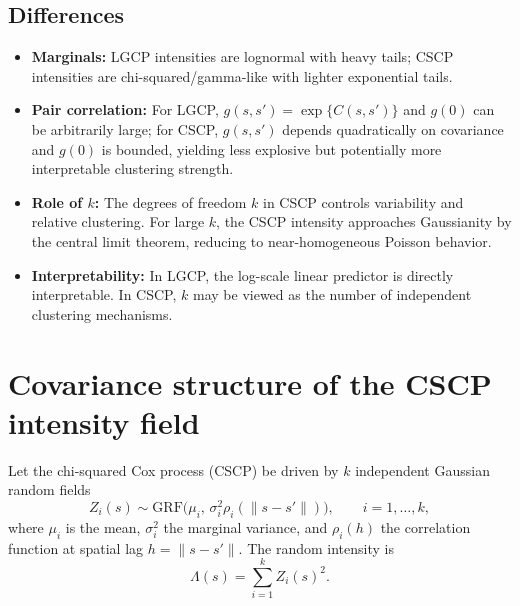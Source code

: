 \documentclass[11pt]{article}
\begin{document}
	\subsection*{Differences}
	\begin{itemize}
		\item \textbf{Marginals:} LGCP intensities are lognormal with heavy tails; CSCP intensities are chi-squared/gamma-like with lighter exponential tails.
		\item \textbf{Pair correlation:} For LGCP, $g(s,s') = \exp\{ C(s,s') \}$ and $g(0)$ can be arbitrarily large; for CSCP, $g(s,s')$ depends quadratically on covariance and $g(0)$ is bounded, yielding less explosive but potentially more interpretable clustering strength.
		\item \textbf{Role of $k$:} The degrees of freedom $k$ in CSCP controls variability and relative clustering. For large $k$, the CSCP intensity approaches Gaussianity by the central limit theorem, reducing to near-homogeneous Poisson behavior.
		\item \textbf{Interpretability:} In LGCP, the log-scale linear predictor is directly interpretable. In CSCP, $k$ may be viewed as the number of independent clustering mechanisms.
	\end{itemize}
	
	
%	




\section{Covariance structure of the CSCP intensity field}

Let the chi-squared Cox process (CSCP) be driven by $k$ independent Gaussian random fields 
\[
Z_i(s) \sim \mathrm{GRF}\!\big(\mu_i,\, \sigma_i^2 \rho_i(\|s-s'\|)\big), 
\qquad i=1,\dots,k,
\]
where $\mu_i$ is the mean, $\sigma_i^2$ the marginal variance, and 
$\rho_i(h)$ the correlation function at spatial lag $h=\|s-s'\|$. 
The random intensity is
\[
\Lambda(s) = \sum_{i=1}^k Z_i(s)^2 .
\]
\end{document}
